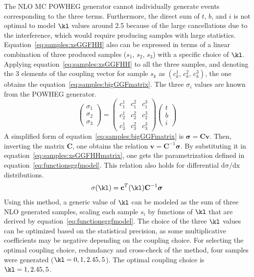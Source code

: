 The NLO MC POWHEG generator cannot individually generate events corresponding to the three terms. Furthermore, the direct sum of $\mathit{t}$, $\mathit{b}$, and $\mathit{i}$ is not optimal to model $\kl$ values around 2.5 because of the large cancellations due to the interference, which would require producing samples with large statistics. Equation~\eqref{eq:samples:xsGGFHH} also can be expressed in terms of a linear combination of three produced samples ($s_1$, $s_2$, $s_3$) with a specific choice of $\kl$. Applying equation~\eqref{eq:samples:xsGGFHH} to all the three samples, and denoting the 3 elements of the coupling vector for sample $s_k$ as $(c_k^1, \, c_k^2, \, c_k^3)$, the one obtains the equation~\ref{eq:samples:bigGGFmatrix}. The three $\sigma_i$ values are known from the POWHEG generator. 
\begin{equation}
\label{eq:samples:bigGGFmatrix}
\begin{pmatrix} \sigma_1 \\ \sigma_2 \\ \sigma_3 \end{pmatrix} = 
\begin{pmatrix}
c_1^1  & c_1^2 & c_1^3 \\
c_2^1  & c_2^2 & c_2^3 \\
c_3^1  & c_3^2 & c_3^3
\end{pmatrix}
\begin{pmatrix} \mathit{t} \\ \mathit{b} \\ \mathit{i} \end{pmatrix}
\end{equation}
A simplified form of equation~\ref{eq:samples:bigGGFmatrix} is  $\boldsymbol{\sigma} = \mathbf{C} \mathbf{v}$. Then, inverting the matrix $\mathbf{C}$, one obtains the relation $\mathbf{v} = \mathbf{C}^{-1} \boldsymbol{\sigma}$. By substituting it in equation~\eqref{eq:samples:xsGGFHHmatrix}, one gets the parametrization defined in equation~\ref{eq:functionsggfmodel}. This relation also holds for differential $\mathrm{d\sigma/dx}$ distributions. 
\begin{equation}
\label{eq:functionsggfmodel}
\sigma(\kl) = \mathbf{c}^{T}(\kl) \mathbf{C}^{-1} \boldsymbol{\sigma}
\end{equation}
Using this method, a generic value of $\kl$ can be modeled as the sum of three NLO generated samples, scaling each sample $s_i$ by functions of $\kl$ that are derived by equation~\ref{eq:functionsggfmodel}. The choice of the three $\kl$ values can be optimized based on the statistical precision, as some multiplicative coefficients may be negative depending on the coupling choice. For selecting the optimal coupling choice, redundancy and cross-check of the method, four samples were generated ($\kl = 0, 1, 2.45, 5$). The optimal coupling choice is $\kl = 1, 2.45, 5$.


